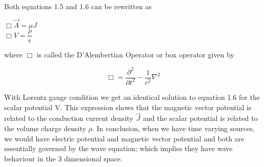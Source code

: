 Both equations 1.5 and 1.6 can be rewritten as
\begin{center}
$\Box\vec{A}=\mu J$\\
$\Box V=\dfrac{\rho}{\epsilon}$\\
\end{center}
where $\Box$ is called the D'Alembertian Operator or box operator given by 

$$\Box=\dfrac{\partial^{2}}{\partial t^{2}}-\dfrac{1}{c^{2}}\nabla^{2}$$

With Lorentz gauge condition we get an identical solution to equation 1.6 for the scalar potential V. This expression shows that the magnetic vector potential is related to the conduction current density $\vec{J}$ and the scalar potential is related to the volume charge density $\rho$. In conclusion, when we have time varying sources, we would have electric potential and magnetic vector potential and both are essentially governed by the wave equation; which implies they have wave behaviour in the 3 dimensional space.